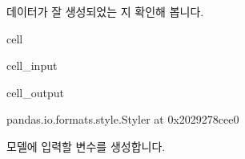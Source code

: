 \documentclass[letterpaper,10pt,english]{jupyterBook}
\begin{document}
\sphinxAtStartPar
 데이터가 잘 생성되었는 지 확인해 봅니다.

\begin{sphinxuseclass}{cell}\begin{sphinxVerbatimInput}

\begin{sphinxuseclass}{cell_input}
\begin{sphinxVerbatim}[commandchars=\\\{\}]
\end{sphinxVerbatim}

\end{sphinxuseclass}\end{sphinxVerbatimInput}
\begin{sphinxVerbatimOutput}

\begin{sphinxuseclass}{cell_output}
\begin{sphinxVerbatim}[commandchars=\\\{\}]
\PYGZlt{}pandas.io.formats.style.Styler at 0x2029278cee0\PYGZgt{}
\end{sphinxVerbatim}

\end{sphinxuseclass}\end{sphinxVerbatimOutput}

\end{sphinxuseclass}
\sphinxAtStartPar
  모델에 입력할 변수를 생성합니다.
\end{document}
